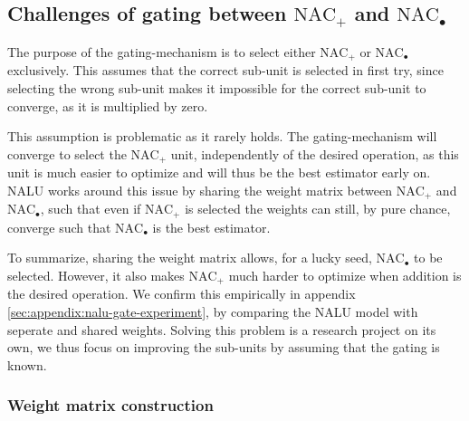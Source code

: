 \subsection{Challenges of gating between \texorpdfstring{$\text{NAC}_{+}$}{NAC-add} and \texorpdfstring{$\text{NAC}_{\bullet}$}{NAC-mul}}
\label{sec:methods:gatting-issue}
The purpose of the gating-mechanism is to select either $\text{NAC}_{+}$ or $\text{NAC}_{\bullet}$ exclusively. This assumes that the correct sub-unit is selected in first try, since selecting the wrong sub-unit makes it impossible for the correct sub-unit to converge, as it is multiplied by zero.

This assumption is problematic as it rarely holds. The gating-mechanism will converge to select the $\text{NAC}_{+}$ unit, independently of the desired operation, as this unit is much easier to optimize and will thus be the best estimator early on. NALU works around this issue by sharing the weight matrix between $\text{NAC}_{+}$ and $\text{NAC}_{\bullet}$, such that even if $\text{NAC}_{+}$ is selected the weights can still, by pure chance, converge such that $\text{NAC}_{\bullet}$ is the best estimator.

To summarize, sharing the weight matrix allows, for a lucky seed, $\text{NAC}_{\bullet}$ to be selected. However, it also makes $\text{NAC}_{+}$ much harder to optimize when addition is the desired operation. We confirm this empirically in appendix \ref{sec:appendix:nalu-gate-experiment}, by comparing the NALU model with seperate and shared weights. Solving this problem is a research project on its own, we thus focus on improving the sub-units by assuming that the gating is known.


\subsubsection{Weight matrix construction}\label{sssec:weight}


